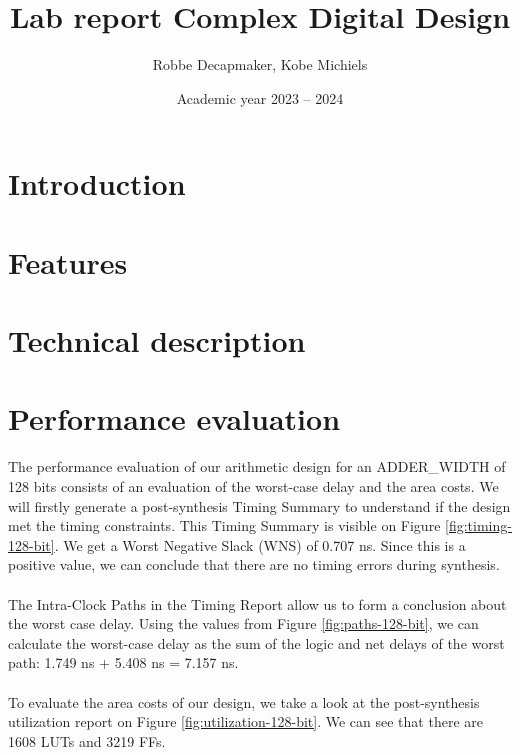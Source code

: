 \documentclass[a4paper,kul]{kulakarticle} %
\date{Academic year 2023 -- 2024}
\title{Lab report Complex Digital Design}
\author{Robbe Decapmaker, Kobe Michiels}
\begin{document}
\maketitle
\section{Introduction}

\section{Features}


\section{Technical description}


\section{Performance evaluation}


The performance evaluation of our arithmetic design for an ADDER\_WIDTH of 128 bits consists of an evaluation of the worst-case delay and the area costs. We will firstly generate a post-synthesis Timing Summary to understand if the design met the timing constraints. This Timing Summary is visible on Figure \ref{fig:timing-128-bit}. We get a Worst Negative Slack (WNS) of 0.707 ns. Since this is a positive value, we can conclude that there are no timing errors during synthesis.
\\\\
The Intra-Clock Paths in the Timing Report allow us to form a conclusion about the worst case delay. Using the values from Figure \ref{fig:paths-128-bit}, we can calculate the worst-case delay as the sum of the logic and net delays of the worst path: 1.749 ns + 5.408 ns = 7.157 ns.
\\\\
To evaluate the area costs of our design, we take a look at the post-synthesis utilization report on Figure \ref{fig:utilization-128-bit}. We can see that there are 1608 LUTs and 3219 FFs.  
\end{document}
